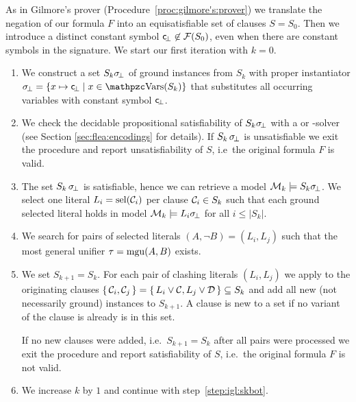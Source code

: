 \begin{procedure}\label{proc:inst:gen:loop}
	As in Gilmore's prover (Procedure~\ref{proc:gilmore's:prover})
	we translate the negation of our formula \( F \) into an equisatisfiable set of clauses
	\( S = S_0 \). Then we introduce a distinct constant symbol
	\( \mathsf{c} \!_\bot\not\in\mathcal{F}(S_0) \), even when there are constant symbols in the signature.
	We start our first iteration with \( k=0 \).

	\begin{enumerate}
		\item\label{step:igl:skbot}
		We construct a set \( S_{k}\sigma \!_\bot \) of ground instances from \( S_k \)
		with proper instantiator \( \subsbot = \{ x\mapsto \consbot \mid x\in\var(S_k) \} \)
		that substitutes all occurring variables with constant symbol \( \mathsf{c} \!_\bot \).
%
		\item\label{step:igl:sksat} 
		We check the decidable propositional satisfiability of
		\( S_k\sigma \!_\bot \) with a \SAT{} or \SMT{}-solver
		(see Section \vref{sec:flea:encodings} for details).
		If \( S_k \, \sigma \!_\bot \) is unsatisfiable
		we exit the procedure 
		and report
		{ unsatisfiability} of \( S \), i.e~the original formula \( F \) is valid.

		\item\label{step:igl:model} The set \( S_k \, \sigma \!_\bot \) is satisfiable, hence we can retrieve a model \( \mathcal{M}_k \models S_k\sigma \!_\bot \).
		We select one literal \( L_i = \operatorname{sel}(\mathcal{C}_i) \) per clause \( \mathcal{C}_i \in S_k \)
		such that each ground selected literal holds in model
		\( \mathcal{M}_k\models L_i\sigma \!_\bot \) for all \( i \leq | S_k | \).

		\item\label{step:igl:clashes} We search for pairs of selected literals
		\( (A, \lnot B) = (L_i, L_j) \)
		such that the most general unifier \( \tau = \operatorname{mgu}(A,B) \) exists.

		\item We set \( S_{k+1} = S_k \). For each pair of clashing literals
		\( (L_i, L_j) \)
		we apply \InstGen{} to the originating clauses
		\( \{ \, \mathcal{C}_{i}, \mathcal{C}_{j} \, \} = \{ \, L_i\lor\mathcal{C}, L_j\lor\mathcal{D} \, \} \subseteq S_k \)
		and add all new (not necessarily ground) instances to \( S_{k+1} \).
		A clause is new to a set if no variant of the clause is already is in this set.

		If no new clauses were added, i.e.~\( S_{k+1} = S_k \) after all pairs were processed we exit the procedure and report { satisfiability} of \( S \), i.e.~the original formula \( F \) is not valid.

		\item We increase \( k \) by \( 1 \) and continue with step~\ref{step:igl:skbot}.

	\end{enumerate}
\end{procedure}

